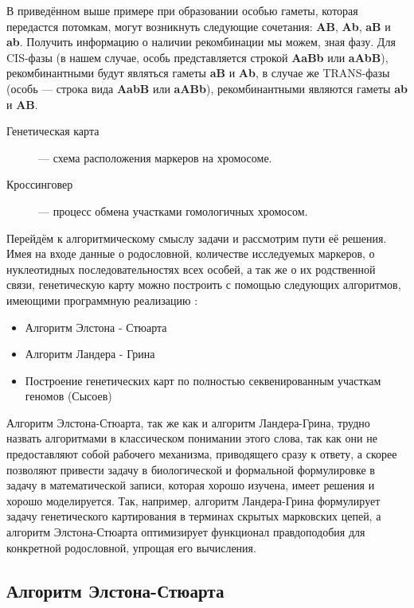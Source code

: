 \documentclass{matmex-diploma-custom}
\begin{document}
В приведённом выше примере при образовании особью гаметы, которая
передастся потомкам, могут возникнуть следующие сочетания:
\textbf{AB}, \textbf{Ab}, \textbf{aB} и \textbf{ab}. Получить
информацию о наличии рекомбинации мы можем, зная фазу. Для CIS-фазы (в
нашем случае, особь представляется строкой \textbf{AaBb} или
\textbf{aAbB}), рекомбинантными будут являться гаметы \textbf{aB} и
\textbf{Ab}, в случае же TRANS-фазы (особь --- строка вида
\textbf{AabB} или \textbf{aABb}), рекомбинантными являются гаметы
\textbf{ab} и \textbf{AB}.

\begin{description}
\item[Генетическая карта] --- схема расположения маркеров на
  хромосоме.
\item[Кроссинговер] --- процесс обмена участками
  гомологичных хромосом.
\end{description}

Перейдём к алгоритмическому смыслу задачи и рассмотрим пути её
решения. Имея на входе данные о родословной, количестве исследуемых
маркеров, о нуклеотидных последовательностях всех особей, а так же о
их родственной связи, генетическую карту можно построить с помощью
следующих алгоритмов, имеющими программную реализацию
\cite{fishelson2002exact}:
\begin{itemize}
\item Алгоритм Элстона - Стюарта
\item Алгоритм Ландера - Грина
\item Построение генетических карт по полностью секвенированным
  участкам геномов (Сысоев)
\end{itemize}

Алгоритм Элстона-Стюарта, так же как и алгоритм Ландера-Грина, трудно
назвать алгоритмами в классическом понимании этого слова, так как они
не предоставляют собой рабочего механизма, приводящего сразу к ответу,
а скорее позволяют привести задачу в биологической и формальной
формулировке в задачу в математической записи, которая хорошо изучена,
имеет решения и хорошо моделируется. Так, например, алгоритм
Ландера-Грина формулирует задачу генетического картирования в терминах
скрытых марковских цепей, а алгоритм Элстона-Стюарта оптимизирует
функционал правдоподобия для конкретной родословной, упрощая его
вычисления.

\subsection{Алгоритм Элстона-Стюарта}
\end{document}
